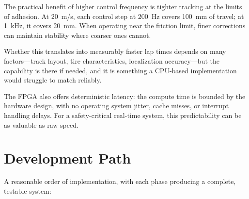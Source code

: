 \documentclass[12pt,a4paper]{article}
\begin{document}
The practical benefit of higher control frequency is tighter tracking at the limits of adhesion. At 20~m/s, each control step at 200~Hz covers 100~mm of travel; at 1~kHz, it covers 20~mm. When operating near the friction limit, finer corrections can maintain stability where coarser ones cannot.

Whether this translates into measurably faster lap times depends on many factors---track layout, tire characteristics, localization accuracy---but the capability is there if needed, and it is something a CPU-based implementation would struggle to match reliably.

The FPGA also offers deterministic latency: the compute time is bounded by the hardware design, with no operating system jitter, cache misses, or interrupt handling delays. For a safety-critical real-time system, this predictability can be as valuable as raw speed.

\section{Development Path}

A reasonable order of implementation, with each phase producing a complete, testable system:
\end{document}
